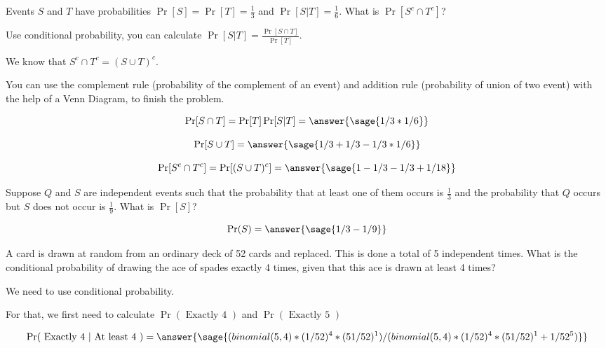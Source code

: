 \documentclass{ximera}
\begin{document}
\begin{problem}
 Events $S$ and $T$ have probabilities $\Pr[S] = \Pr[T] =\frac{1}{3}$ and $\Pr[S|T] =\frac{1}{6} $. What is $\Pr[S^c\cap T^c]$?
\begin{hint}
    \item Use conditional probability, you can calculate $\Pr[S|T]=\frac{\Pr[S \cap T]}{\Pr[T]}$.     \item We know that $S^c\cap T^c=(S\cup T)^c$. 
    \item You can use the complement rule (probability of the complement of an event) and addition rule (probability of union of two event) with the help of a Venn Diagram, to finish the problem.
\end{hint}

\begin{prompt}
$$
\Pr[S \cap T]=\Pr[T]\Pr[S|T]=\answer{\sage{1/3*1/6}}
$$ 

$$
\Pr[S \cup T]=\answer{\sage{1/3+1/3-1/3*1/6}}
$$ 

$$
\Pr[S^c \cap T^c]=\Pr[(S \cup T)^c]=\answer{\sage{1-1/3-1/3+1/18}}
$$
\end{prompt}

\end{problem}

\begin{problem}
Suppose $Q$ and $S$ are independent events such that the probability that at least one of them occurs is $\frac{1}{3}$ and the probability that $Q$ occurs but $S$ does not occur is $\frac{1}{9}$. What is $\Pr[S]$?

\begin{prompt}
$$\Pr(S)=\answer{\sage{1/3-1/9}}$$
\end{prompt}

\end{problem}

\begin{problem}
A card is drawn at random from an ordinary deck of 52 cards and replaced. This is done a total of 5 independent times. What is the conditional probability of drawing the ace of spades exactly 4 times, given that this ace is drawn at least 4 times?
\begin{hint}
    \item We need to use conditional probability.
    \item For that, we first need to calculate 
$
\Pr(\text{ Exactly 4 })$
and
$
\Pr(\text{ Exactly 5 })
$
\end{hint}

\begin{prompt}
$$
\Pr(\text{ Exactly 4 } | \text{ At least 4 })
=
\answer{
\sage{(binomial(5,4)*(1/52)^4*(51/52)^1)/(binomial(5,4)*(1/52)^4*(51/52)^1+1/52^5)}
}
$$
\end{prompt}

\end{problem}
\end{document}
